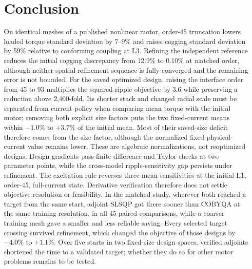 \documentclass{anvil-paper}
\begin{document}
\section{Conclusion}
On identical meshes of a published nonlinear motor, order-45 truncation
lowers loaded torque standard deviation by 7--9\% and raises cogging
standard deviation by 59\% relative to conforming coupling at L3.
Refining the independent reference reduces the initial cogging discrepancy
from 12.9\% to 0.10\% at matched order, although neither spatial-refinement
sequence is fully converged and the remaining error is not bounded. For the saved optimized
design, raising the interface order from 45 to 93 multiplies the
squared-ripple objective by 3.6 while preserving a reduction above
2,400-fold. Its shorter stack and changed radial scale must be separated
from current policy when comparing mean torque with the initial motor;
removing both explicit size factors puts the two fixed-current means
within $-1.0\%$ to $+3.7\%$ of the initial mean. Most of their saved-size
deficit therefore comes from the size factor, although the normalized
fixed-physical-current value remains lower. These are algebraic
normalizations, not reoptimized designs.
Design gradients pass finite-difference and Taylor checks at two parameter
points, while the cross-model ripple-sensitivity gap persists under
refinement. The excitation rule reverses three mean sensitivities at the
initial L1, order-45, full-current state. Derivative verification therefore
does not settle objective resolution or feasibility. In the matched
study, wherever both reached a target from the same start, adjoint SLSQP
got there sooner than COBYQA at the same training resolution, in all 45
paired comparisons, while a coarser training mesh gave a smaller and less
reliable saving. Every selected target crossing survived refinement, which
changed the objective of those designs by $-4.0\%$ to $+1.1\%$. Over five
starts in two fixed-size design spaces, verified adjoints shortened the
time to a validated target; whether they do so for other motor problems
remains to be tested.
\end{document}

